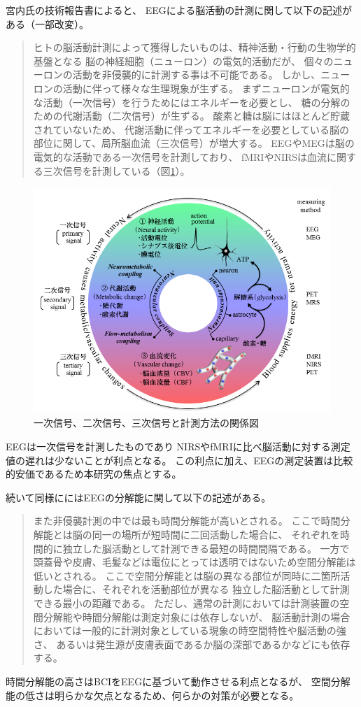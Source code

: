 宮内氏の技術報告書\cite{脳を測る}によると、
EEGによる脳活動の計測に関して以下の記述がある（一部改変）。
\begin{quotation}
ヒトの脳活動計測によって獲得したいものは、精神活動・行動の生物学的基盤となる
脳の神経細胞（ニューロン）の電気的活動だが、
個々のニューロンの活動を非侵襲的に計測する事は不可能である。
しかし、ニューロンの活動に伴って様々な生理現象が生ずる。
まずニューロンが電気的な活動（一次信号）を行うためにはエネルギーを必要とし、
糖の分解のための代謝活動（二次信号）が生ずる。
酸素と糖は脳にはほとんど貯蔵されていないため、
代謝活動に伴ってエネルギーを必要としている脳の部位に関して、局所脳血流（三次信号）が増大する。
EEGやMEGは脳の電気的な活動である一次信号を計測しており、
fMRIやNIRSは血流に関する三次信号を計測している（図\ref{fig:信号フロー}\cite{脳を測る}）。
\end{quotation}
\begin{figure}
    \centering
    \includegraphics[width=12cm]{images/signalflow.png}
    \caption{一次信号、二次信号、三次信号と計測方法の関係図\cite{脳を測る}}
    \label{fig:信号フロー}
\end{figure}
EEGは一次信号を計測したものであり
NIRSやfMRIに比べ脳活動に対する測定値の遅れは少ないことが利点となる。
この利点に加え、EEGの測定装置は比較的安価であるため本研究の焦点とする。

続いて同様に\cite{脳を測る}にはEEGの分解能に関して以下の記述がある。
\begin{quotation}
また非侵襲計測の中では最も時間分解能が高いとされる。
ここで時間分解能とは脳の同一の場所が短時間に二回活動した場合に、
それぞれを時間的に独立した脳活動として計測できる最短の時間間隔である。
一方で頭蓋骨や皮膚、毛髪などは電位にとっては透明ではないため空間分解能は低いとされる。
ここで空間分解能とは脳の異なる部位が同時に二箇所活動した場合に、それぞれを活動部位が異なる
独立した脳活動として計測できる最小の距離である。
ただし、通常の計測においては計測装置の空間分解能や時間分解能は測定対象には依存しないが、
脳活動計測の場合においては一般的に計測対象としている現象の時空間特性や脳活動の強さ、
あるいは発生源が皮膚表面であるか脳の深部であるかなどにも依存する。
\end{quotation}
時間分解能の高さはBCIをEEGに基づいて動作させる利点となるが、
空間分解能の低さは明らかな欠点となるため、何らかの対策が必要となる。

